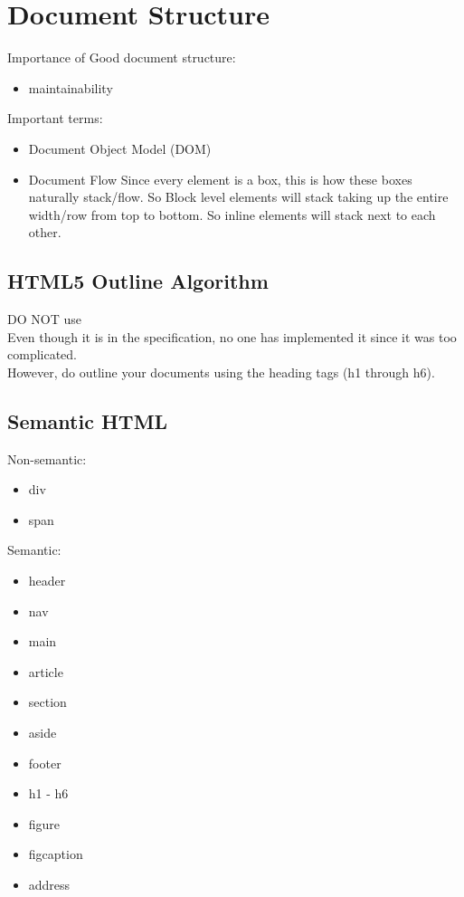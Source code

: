 \documentclass[]{article}
\begin{document}
\section{Document Structure}
Importance of Good document structure:
\begin{itemize}
	\item maintainability
\end{itemize}
Important terms:
\begin{itemize}
	\item Document Object Model (DOM)
	
	\item Document Flow
	\subitem Since every element is a box, this is how these boxes naturally stack/flow.
	\subitem So Block level elements will stack taking up the entire width/row from top to bottom.
	\subitem So inline elements will stack next to each other.
\end{itemize}

\subsection{HTML5 Outline Algorithm}
DO NOT use
\\
Even though it is in the specification, no one has implemented it since it was too complicated.
\\
However, do outline your documents using the heading tags (h1 through h6).

\subsection{Semantic HTML}
Non-semantic:
\begin{itemize}
	\item div
	\item span
\end{itemize}
Semantic:
\begin{itemize}
	\item header
	\item nav
	\item main
	\item article
	\item section
	\item aside
	\item footer
	\item h1 - h6
	\item figure
	\item figcaption
	\item address
\end{itemize}
\end{document}
